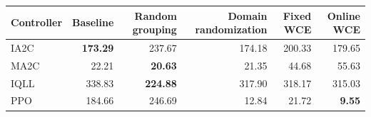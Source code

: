 \begin{tabular}{lrrrrr}
\hline
Controller & Baseline & Random grouping & Domain randomization & Fixed WCE & Online WCE \\
\hline
IA2C & \textbf{173.29} & 237.67 & 174.18 & 200.33 & 179.65 \\
MA2C & 22.21 & \textbf{20.63} & 21.35 & 44.68 & 55.63 \\
IQLL & 338.83 & \textbf{224.88} & 317.90 & 318.17 & 315.03 \\
PPO & 184.66 & 246.69 & 12.84 & 21.72 & \textbf{9.55} \\
\hline
\end{tabular}
